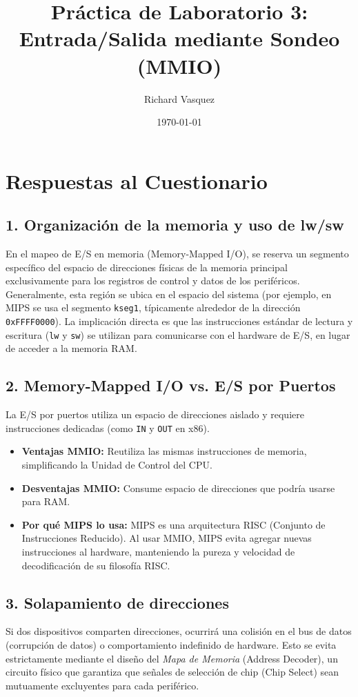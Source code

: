 \documentclass[12pt, a4paper]{article}
\title{Práctica de Laboratorio 3: Entrada/Salida mediante Sondeo (MMIO)}
\author{Richard Vasquez}
\date{\today}
\begin{document}
\maketitle

\section{Respuestas al Cuestionario}

\subsection{1. Organización de la memoria y uso de lw/sw}
En el mapeo de E/S en memoria (Memory-Mapped I/O), se reserva un segmento específico del espacio de direcciones físicas de la memoria principal exclusivamente para los registros de control y datos de los periféricos. Generalmente, esta región se ubica en el espacio del sistema (por ejemplo, en MIPS se usa el segmento \texttt{kseg1}, típicamente alrededor de la dirección \texttt{0xFFFF0000}). La implicación directa es que las instrucciones estándar de lectura y escritura (\texttt{lw} y \texttt{sw}) se utilizan para comunicarse con el hardware de E/S, en lugar de acceder a la memoria RAM.

\subsection{2. Memory-Mapped I/O vs. E/S por Puertos}
La E/S por puertos utiliza un espacio de direcciones aislado y requiere instrucciones dedicadas (como \texttt{IN} y \texttt{OUT} en x86). 
\begin{itemize}
    \item \textbf{Ventajas MMIO:} Reutiliza las mismas instrucciones de memoria, simplificando la Unidad de Control del CPU.
    \item \textbf{Desventajas MMIO:} Consume espacio de direcciones que podría usarse para RAM.
    \item \textbf{Por qué MIPS lo usa:} MIPS es una arquitectura RISC (Conjunto de Instrucciones Reducido). Al usar MMIO, MIPS evita agregar nuevas instrucciones al hardware, manteniendo la pureza y velocidad de decodificación de su filosofía RISC.
\end{itemize}

\subsection{3. Solapamiento de direcciones}
Si dos dispositivos comparten direcciones, ocurrirá una colisión en el bus de datos (corrupción de datos) o comportamiento indefinido de hardware. Esto se evita estrictamente mediante el diseño del \textit{Mapa de Memoria} (Address Decoder), un circuito físico que garantiza que señales de selección de chip (Chip Select) sean mutuamente excluyentes para cada periférico.
\end{document}
